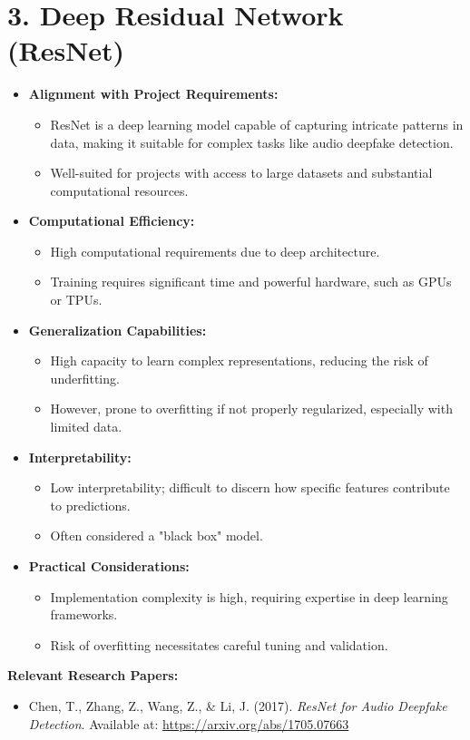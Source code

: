 \documentclass{article}
\begin{document}
\section*{3. Deep Residual Network (ResNet)}

\begin{itemize}
    \item \textbf{Alignment with Project Requirements:}
    \begin{itemize}
        \item ResNet is a deep learning model capable of capturing intricate patterns in data, making it suitable for complex tasks like audio deepfake detection.
        \item Well-suited for projects with access to large datasets and substantial computational resources.
    \end{itemize}
    \item \textbf{Computational Efficiency:}
    \begin{itemize}
        \item High computational requirements due to deep architecture.
        \item Training requires significant time and powerful hardware, such as GPUs or TPUs.
    \end{itemize}
    \item \textbf{Generalization Capabilities:}
    \begin{itemize}
        \item High capacity to learn complex representations, reducing the risk of underfitting.
        \item However, prone to overfitting if not properly regularized, especially with limited data.
    \end{itemize}
    \item \textbf{Interpretability:}
    \begin{itemize}
        \item Low interpretability; difficult to discern how specific features contribute to predictions.
        \item Often considered a "black box" model.
    \end{itemize}
    \item \textbf{Practical Considerations:}
    \begin{itemize}
        \item Implementation complexity is high, requiring expertise in deep learning frameworks.
        \item Risk of overfitting necessitates careful tuning and validation.
    \end{itemize}
\end{itemize}

\noindent
\textbf{Relevant Research Papers:}
\begin{itemize}
    \item Chen, T., Zhang, Z., Wang, Z., \& Li, J. (2017). \textit{ResNet for Audio Deepfake Detection}. Available at: \url{https://arxiv.org/abs/1705.07663}
\end{itemize}
\end{document}

